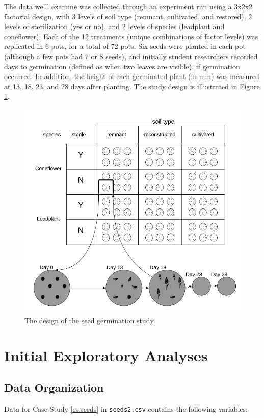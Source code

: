 \documentclass[
]{krantz}
\begin{document}
The data we'll examine was collected through an experiment run using a 3x2x2 factorial design, with 3 levels of soil type (remnant, cultivated, and restored), 2 levels of sterilization (yes or no), and 2 levels of species (leadplant and coneflower). Each of the 12 treatments (unique combinations of factor levels) was replicated in 6 pots, for a total of 72 pots. Six seeds were planted in each pot (although a few pots had 7 or 8 seeds), and initially student researchers recorded days to germination (defined as when two leaves are visible), if germination occurred. In addition, the height of each germinated plant (in mm) was measured at 13, 18, 23, and 28 days after planting. The study design is illustrated in Figure \ref{fig:seedstudy}.

\begin{figure}
\includegraphics[width=0.8\linewidth]{data/StudyDesignDiagram} \caption{The design of the seed germination study.}\label{fig:seedstudy}
\end{figure}

\section{Initial Exploratory Analyses}\label{explore3}

\subsection{Data Organization}\label{organizedata3}

Data for Case Study \ref{cs:seeds} in \texttt{seeds2.csv} contains the following variables:
\end{document}
